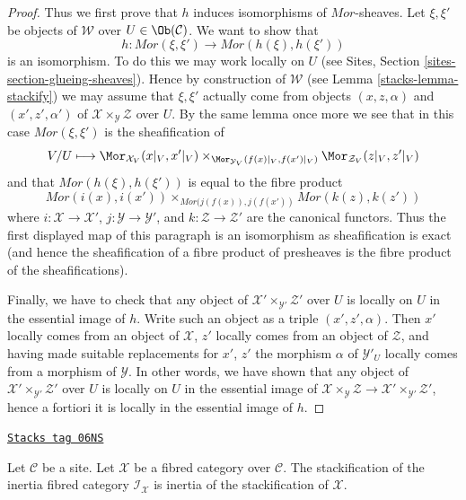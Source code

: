 \begin{proof}
\medskip\noindent
Thus we first prove that $h$ induces isomorphisms of $\mathit{Mor}$-sheaves.
Let $\xi, \xi'$ be objects of $\mathcal{W}$ over
$U \in \Ob(\mathcal{C})$. We want to show that
$$
h : \mathit{Mor}(\xi, \xi') \longrightarrow \mathit{Mor}(h(\xi), h(\xi'))
$$
is an isomorphism. To do this we may work locally on $U$ (see
Sites, Section \ref{sites-section-glueing-sheaves}).
Hence by construction of $\mathcal{W}$ (see
Lemma \ref{stacks-lemma-stackify})
we may assume that $\xi, \xi'$
actually come from objects $(x, z, \alpha)$ and $(x', z', \alpha')$
of $\mathcal{X} \times_\mathcal{Y} \mathcal{Z}$ over $U$.
By the same lemma once more we see that in this case
$\mathit{Mor}(\xi, \xi')$ is the sheafification of
$$
V/U \longmapsto
\Mor_{\mathcal{X}_V}(x|_V, x'|_V)
\times_{\Mor_{\mathcal{Y}_V}(f(x)|_V, f(x')|_V)}
\Mor_{\mathcal{Z}_V}(z|_V, z'|_V)
$$
and that $\mathit{Mor}(h(\xi), h(\xi'))$ is equal to the fibre product
$$
\mathit{Mor}(i(x), i(x'))
\times_{\mathit{Mor}(j(f(x)), j(f(x'))}
\mathit{Mor}(k(z), k(z'))
$$
where $i : \mathcal{X} \to \mathcal{X}'$,
$j : \mathcal{Y} \to \mathcal{Y}'$, and
$k : \mathcal{Z} \to \mathcal{Z}'$ are the canonical functors.
Thus the first displayed map of this paragraph is an isomorphism as
sheafification is exact (and hence the sheafification of a fibre product
of presheaves is the fibre product of the sheafifications).

\medskip\noindent
Finally, we have to check that any object of
$\mathcal{X}' \times_{\mathcal{Y}'} \mathcal{Z}'$
over $U$ is locally on $U$ in the essential image of $h$.
Write such an object as a triple $(x', z', \alpha)$.
Then $x'$ locally comes from an object of $\mathcal{X}$,
$z'$ locally comes from an object of $\mathcal{Z}$, and
having made suitable replacements for $x'$, $z'$ the morphism
$\alpha$ of $\mathcal{Y}'_U$ locally comes from a morphism of
$\mathcal{Y}$. In other words, we have shown that any object of
$\mathcal{X}' \times_{\mathcal{Y}'} \mathcal{Z}'$
over $U$ is locally on $U$ in the essential image of
$\mathcal{X} \times_\mathcal{Y} \mathcal{Z} \to
\mathcal{X}' \times_{\mathcal{Y}'} \mathcal{Z}'$, hence
a fortiori it is locally in the essential image of $h$.
\end{proof}

\begin{lemma}
\label{stacks-lemma-stackification-inertia}
\href{https://stacks.math.columbia.edu/tag/06NS}{\texttt{Stacks tag 06NS}}

Let $\mathcal{C}$ be a site.
Let $\mathcal{X}$ be a fibred category over $\mathcal{C}$.
The stackification of the inertia fibred category $\mathcal{I}_\mathcal{X}$
is inertia of the stackification of $\mathcal{X}$.
\end{lemma}


